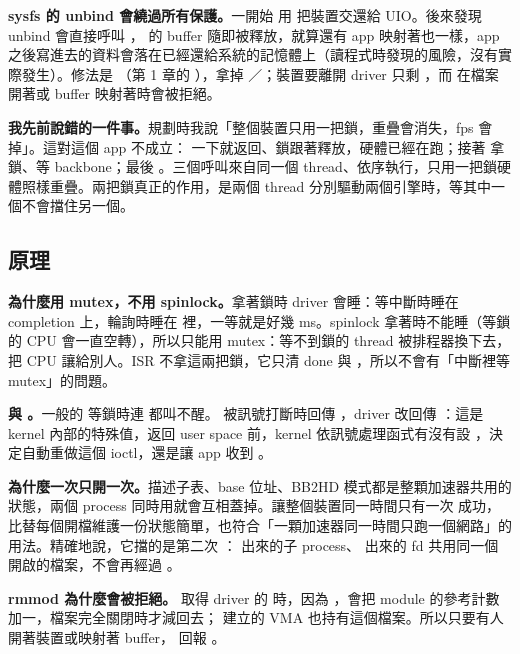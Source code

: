 \begin{pit}
\textbf{sysfs 的 unbind 會繞過所有保護。}一開始  用  把裝置交還給 UIO。後來發現 unbind 會直接呼叫 ， 的 buffer 隨即被釋放，就算還有 app 映射著也一樣，app 之後寫進去的資料會落在已經還給系統的記憶體上（讀程式時發現的風險，沒有實際發生）。修法是 （第 1 章的 ），拿掉 ／；裝置要離開 driver 只剩 ，而  在檔案開著或 buffer 映射著時會被拒絕。

\textbf{我先前說錯的一件事。}規劃時我說「整個裝置只用一把鎖，重疊會消失，fps 會掉」。這對這個 app 不成立： 一下就返回、鎖跟著釋放，硬體已經在跑；接著  拿鎖、等 backbone；最後 。三個呼叫來自同一個 thread、依序執行，只用一把鎖硬體照樣重疊。兩把鎖真正的作用，是兩個 thread 分別驅動兩個引擎時，等其中一個不會擋住另一個。
\end{pit}

\subsection{原理}

\textbf{為什麼用 mutex，不用 spinlock。}拿著鎖時 driver 會睡：等中斷時睡在 completion 上，輪詢時睡在  裡，一等就是好幾 ms。spinlock 拿著時不能睡（等鎖的 CPU 會一直空轉），所以只能用 mutex：等不到鎖的 thread 被排程器換下去，把 CPU 讓給別人。ISR 不拿這兩把鎖，它只清 done 與 ，所以不會有「中斷裡等 mutex」的問題。

\textbf{ 與 。}一般的  等鎖時連  都叫不醒。 被訊號打斷時回傳 ，driver 改回傳 ：這是 kernel 內部的特殊值，返回 user space 前，kernel 依訊號處理函式有沒有設 ，決定自動重做這個 ioctl，還是讓 app 收到 。

\textbf{為什麼一次只開一次。}描述子表、base 位址、BB2HD 模式都是整顆加速器共用的狀態，兩個 process 同時用就會互相蓋掉。讓整個裝置同一時間只有一次  成功，比替每個開檔維護一份狀態簡單，也符合「一顆加速器同一時間只跑一個網路」的用法。精確地說，它擋的是第二次 ： 出來的子 process、 出來的 fd 共用同一個開啟的檔案，不會再經過 。

\textbf{rmmod 為什麼會被拒絕。} 取得 driver 的  時，因為 ，會把 module 的參考計數加一，檔案完全關閉時才減回去； 建立的 VMA 也持有這個檔案。所以只要有人開著裝置或映射著 buffer， 回報 。


